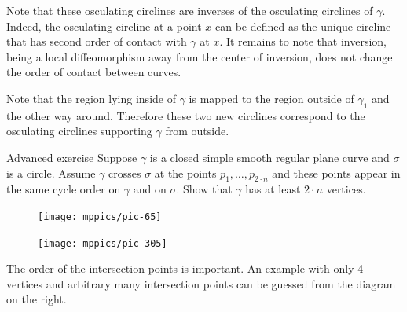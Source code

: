 \documentclass{article}
\begin{document}
Note that these osculating circlines are inverses of the osculating circlines of $\gamma$.
Indeed, the osculating circline at a point $x$ can be defined as the unique circline that has second order of contact with $\gamma$ at $x$.
It remains to note that inversion, being a local diffeomorphism away from the center of inversion, does not change the order of contact between curves.

Note that the region lying inside of $\gamma$ is mapped to the region outside of $\gamma_1$ and the other way around.
Therefore these two new circlines correspond to the osculating circlines supporting $\gamma$ from outside.
\qeds

\begin{thm}{Advanced exercise}\label{ex:curve-crosses-circle}
Suppose $\gamma$ is a closed simple smooth regular plane curve and $\sigma$ is a circle.
Assume $\gamma$ crosses $\sigma$ at the points $p_1,\dots,p_{2{\cdot} n}$ and these points appear in the same cycle order on $\gamma$ and on $\sigma$.
Show that $\gamma$ has at least $2\cdot n$ vertices.
\end{thm}


\begin{figure}[!ht]
\begin{minipage}{.48\textwidth}
\centering
\texttt{[image: mppics/pic-65]}
\end{minipage}\hfill
\begin{minipage}{.48\textwidth}
\centering
\texttt{[image: mppics/pic-305]}
\end{minipage}
\end{figure}

The order of the intersection points is important. 
An example with only 4 vertices and arbitrary many intersection points can be guessed from the diagram on the right. 



\sloppy
\printbibliography[heading=bibintoc]
\fussy
\end{document}
